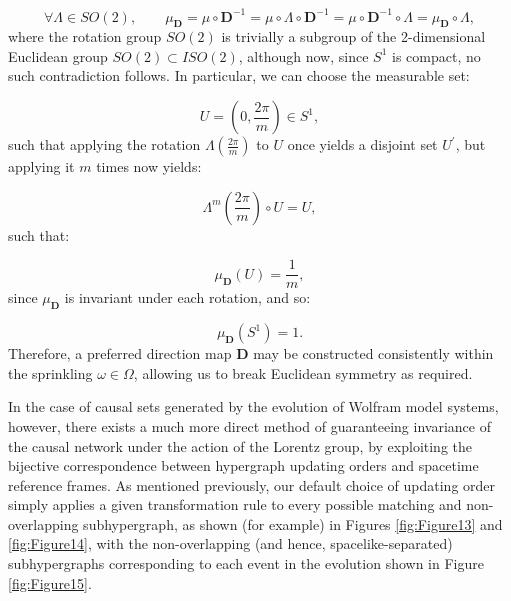 \documentclass{article}
\begin{document}
\begin{equation}
\forall \Lambda \in SO \left( 2 \right), \qquad \mu_{\mathbf{D}} = \mu \circ \mathbf{D}^{-1} = \mu \circ \Lambda \circ \mathbf{D}^{-1} = \mu \circ \mathbf{D}^{-1} \circ \Lambda = \mu_{\mathbf{D}} \circ \Lambda,
\end{equation}
where the rotation group ${SO \left( 2 \right)}$ is trivially a subgroup of the 2-dimensional Euclidean group ${SO \left( 2 \right) \subset ISO \left( 2 \right)}$, although now, since ${S^1}$ is compact, no such contradiction follows. In particular, we can choose the measurable set:

\begin{equation}
U = \left( 0, \frac{2 \pi}{m} \right) \in S^1,
\end{equation}
such that applying the rotation ${\Lambda \left( \frac{2 \pi}{m} \right)}$ to $U$ once yields a disjoint set ${U^{\prime}}$, but applying it $m$ times now yields:

\begin{equation}
\Lambda^m \left( \frac{2 \pi}{m} \right) \circ U = U,
\end{equation}
such that:

\begin{equation}
\mu_{\mathbf{D}} \left( U \right) = \frac{1}{m},
\end{equation}
since ${\mu_{\mathbf{D}}}$ is invariant under each rotation, and so:

\begin{equation}
\mu_{\mathbf{D}} \left( S^1 \right) = 1.
\end{equation}
Therefore, a preferred direction map ${\mathbf{D}}$ may be constructed consistently within the sprinkling ${\omega \in \Omega}$, allowing us to break Euclidean symmetry as required.

In the case of causal sets generated by the evolution of Wolfram model systems, however, there exists a much more direct method of guaranteeing invariance of the causal network under the action of the Lorentz group, by exploiting the bijective correspondence between hypergraph updating orders and spacetime reference frames\cite{gorard}. As mentioned previously, our default choice of updating order simply applies a given transformation rule to every possible matching and non-overlapping subhypergraph, as shown (for example) in Figures \ref{fig:Figure13} and \ref{fig:Figure14}, with the non-overlapping (and hence, spacelike-separated) subhypergraphs corresponding to each event in the evolution shown in Figure \ref{fig:Figure15}.
\end{document}
